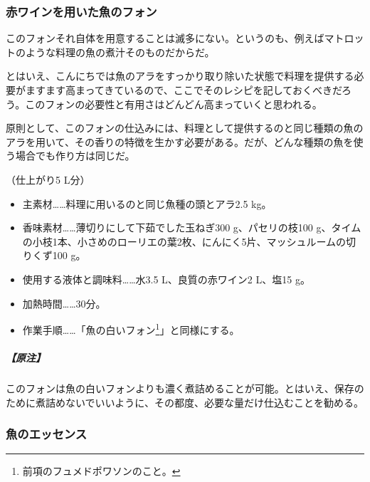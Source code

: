\begin{recette}
{\subsubsection{赤ワインを用いた魚のフォン}\label{fonds-de-poisson-au-vin-rouge}}



このフォンそれ自体を用意することは滅多にない。というのも、例えばマトロットのような料理の魚の煮汁そのものだからだ。

とはいえ、こんにちでは魚のアラをすっかり取り除いた状態で料理を提供する必要がますます高まってきているので、ここでそのレシピを記しておくべきだろう。このフォンの必要性と有用さはどんどん高まっていくと思われる。

原則として、このフォンの仕込みには、料理として提供するのと同じ種類の魚のアラを用いて、その香りの特徴を生かす必要がある。だが、どんな種類の魚を使う場合でも作り方は同じだ。

（仕上がり5 L分）

\begin{itemize}
\item
  主素材\ldots{}\ldots{}料理に用いるのと同じ魚種の頭とアラ2.5 kg。
\item
  香味素材\ldots{}\ldots{}薄切りにして下茹でした玉ねぎ300
  g、パセリの枝100
  g、タイムの小枝1本、小さめのローリエの葉2枚、にんにく5片、マッシュルームの切りくず100
  g。
\item
  使用する液体と調味料\ldots{}\ldots{}水3.5 L、良質の赤ワイン2 L、塩15
  g。
\item
  加熱時間\ldots{}\ldots{}30分。
\item
  作業手順\ldots{}\ldots{}「魚の白いフォン\footnote{前項のフュメドポワソンのこと。}」と同様にする。
\end{itemize}

\hypertarget{nota-fonds-de-poisson-au-vin-rouge}{%
\subparagraph{【原注】}\label{nota-fonds-de-poisson-au-vin-rouge}}

このフォンは魚の白いフォンよりも濃く煮詰めることが可能。とはいえ、保存のために煮詰めないでいいように、その都度、必要な量だけ仕込むことを勧める。

\hypertarget{essence-de-poisson}{%
\subsubsection{魚のエッセンス}\label{essence-de-poisson}}


\end{recette}
